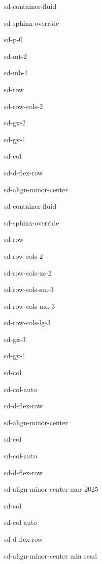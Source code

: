 \documentclass[letterpaper,10pt,italian]{jupyterBook}
\begin{document}
\begin{sphinxuseclass}{sd-container-fluid}
\begin{sphinxuseclass}{sd-sphinx-override}
\begin{sphinxuseclass}{sd-p-0}
\begin{sphinxuseclass}{sd-mt-2}
\begin{sphinxuseclass}{sd-mb-4}
\begin{sphinxuseclass}{sd-row}
\begin{sphinxuseclass}{sd-row-cols-2}
\begin{sphinxuseclass}{sd-gx-2}
\begin{sphinxuseclass}{sd-gy-1}
\begin{sphinxuseclass}{sd-col}
\begin{sphinxuseclass}{sd-d-flex-row}
\begin{sphinxuseclass}{sd-align-minor-center}
\begin{sphinxuseclass}{sd-container-fluid}
\begin{sphinxuseclass}{sd-sphinx-override}
\begin{sphinxuseclass}{sd-row}
\begin{sphinxuseclass}{sd-row-cols-2}
\begin{sphinxuseclass}{sd-row-cols-xs-2}
\begin{sphinxuseclass}{sd-row-cols-sm-3}
\begin{sphinxuseclass}{sd-row-cols-md-3}
\begin{sphinxuseclass}{sd-row-cols-lg-3}
\begin{sphinxuseclass}{sd-gx-3}
\begin{sphinxuseclass}{sd-gy-1}
\begin{sphinxuseclass}{sd-col}
\begin{sphinxuseclass}{sd-col-auto}
\begin{sphinxuseclass}{sd-d-flex-row}
\begin{sphinxuseclass}{sd-align-minor-center}
\end{sphinxuseclass}
\end{sphinxuseclass}
\end{sphinxuseclass}
\end{sphinxuseclass}
\begin{sphinxuseclass}{sd-col}
\begin{sphinxuseclass}{sd-col-auto}
\begin{sphinxuseclass}{sd-d-flex-row}
\begin{sphinxuseclass}{sd-align-minor-center}
 mar 2025

\end{sphinxuseclass}
\end{sphinxuseclass}
\end{sphinxuseclass}
\end{sphinxuseclass}
\begin{sphinxuseclass}{sd-col}
\begin{sphinxuseclass}{sd-col-auto}
\begin{sphinxuseclass}{sd-d-flex-row}
\begin{sphinxuseclass}{sd-align-minor-center}
 min read


\end{sphinxuseclass}
\end{sphinxuseclass}
\end{sphinxuseclass}
\end{sphinxuseclass}
\end{sphinxuseclass}
\end{sphinxuseclass}
\end{sphinxuseclass}
\end{sphinxuseclass}
\end{sphinxuseclass}
\end{sphinxuseclass}
\end{sphinxuseclass}
\end{sphinxuseclass}
\end{sphinxuseclass}
\end{sphinxuseclass}
\end{sphinxuseclass}
\end{sphinxuseclass}
\end{sphinxuseclass}
\end{sphinxuseclass}
\end{sphinxuseclass}
\end{sphinxuseclass}
\end{sphinxuseclass}
\end{sphinxuseclass}
\end{sphinxuseclass}
\end{sphinxuseclass}
\end{sphinxuseclass}
\end{sphinxuseclass}
\end{document}
